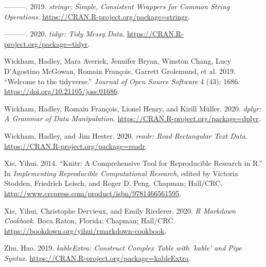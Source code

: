 \documentclass{article}
\begin{document}
\leavevmode\hypertarget{ref-stringr}{}%
---------. 2019. \emph{stringr: Simple, Consistent Wrappers for Common String Operations}. \url{https://CRAN.R-project.org/package=stringr}.

\leavevmode\hypertarget{ref-tidyr}{}%
---------. 2020. \emph{tidyr: Tidy Messy Data}. \url{https://CRAN.R-project.org/package=tidyr}.

\leavevmode\hypertarget{ref-tidyverse}{}%
Wickham, Hadley, Mara Averick, Jennifer Bryan, Winston Chang, Lucy D'Agostino McGowan, Romain François, Garrett Grolemund, et al. 2019. ``Welcome to the tidyverse.'' \emph{Journal of Open Source Software} 4 (43): 1686. \url{https://doi.org/10.21105/joss.01686}.

\leavevmode\hypertarget{ref-dplyr}{}%
Wickham, Hadley, Romain François, Lionel Henry, and Kirill Müller. 2020. \emph{dplyr: A Grammar of Data Manipulation}. \url{https://CRAN.R-project.org/package=dplyr}.

\leavevmode\hypertarget{ref-readr}{}%
Wickham, Hadley, and Jim Hester. 2020. \emph{readr: Read Rectangular Text Data}. \url{https://CRAN.R-project.org/package=readr}.

\leavevmode\hypertarget{ref-knitr}{}%
Xie, Yihui. 2014. ``Knitr: A Comprehensive Tool for Reproducible Research in R.'' In \emph{Implementing Reproducible Computational Research}, edited by Victoria Stodden, Friedrich Leisch, and Roger D. Peng. Chapman; Hall/CRC. \url{http://www.crcpress.com/product/isbn/9781466561595}.

\leavevmode\hypertarget{ref-rmarkdown}{}%
Xie, Yihui, Christophe Dervieux, and Emily Riederer. 2020. \emph{R Markdown Cookbook}. Boca Raton, Florida: Chapman; Hall/CRC. \url{https://bookdown.org/yihui/rmarkdown-cookbook}.

\leavevmode\hypertarget{ref-kableExtra}{}%
Zhu, Hao. 2019. \emph{kableExtra: Construct Complex Table with 'kable' and Pipe Syntax}. \url{https://CRAN.R-project.org/package=kableExtra}.



\end{document}
